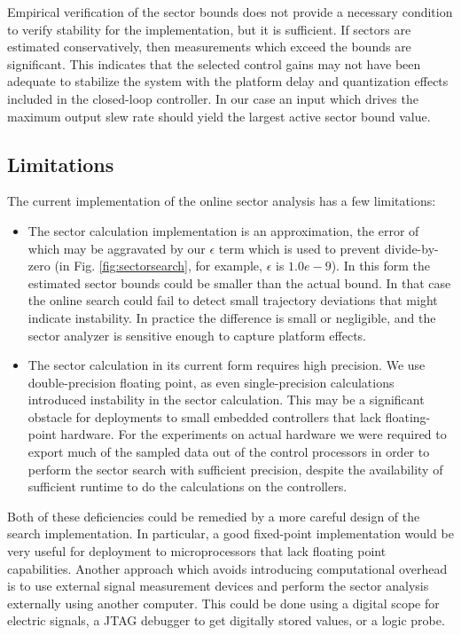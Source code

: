 Empirical verification of the sector bounds does not provide a necessary condition to verify
stability for the implementation, but it is sufficient. If sectors are estimated conservatively, 
then measurements which exceed the bounds are significant.  This indicates 
that the selected control gains may not have been adequate to stabilize the system with the 
platform delay and quantization effects included in the closed-loop controller.  In our case an 
input which drives the maximum output slew rate should yield the largest active sector bound
value.

\newpage

\subsection{Limitations}

The current implementation of the online sector analysis has a few limitations:

\begin{itemize}
 \item The sector calculation implementation is an approximation, the error of which may be
aggravated by our $\epsilon$ term which is used to prevent divide-by-zero  
(in Fig. \ref{fig:sectorsearch}, for example, $\epsilon$ is $1.0e-9$).  In this form the 
estimated sector bounds could be smaller than the actual bound.  In that case the online 
search could fail to detect small trajectory deviations that might indicate instability.  
In practice the difference is small or negligible, and the sector analyzer is sensitive enough 
to capture platform effects.
 \item The sector calculation in its current form requires high precision.  We use 
double-precision floating point, as even single-precision calculations introduced 
instability in the sector calculation.  This may be a significant obstacle for deployments
to small embedded controllers that lack floating-point hardware.  For the experiments on actual
hardware we were required to export much of the sampled data out of the control processors in order 
to perform the sector search with sufficient precision, despite the availability of sufficient 
runtime to do the calculations on the controllers.
\end{itemize}

Both of these deficiencies could be remedied by a more careful design of the search
implementation.  In particular, a good fixed-point implementation would be very useful
for deployment to microprocessors that lack floating point capabilities.  Another approach
which avoids introducing computational overhead is to use external signal measurement 
devices and perform the sector analysis externally using another computer. This could be 
done using a digital scope for electric signals, a JTAG debugger to get digitally stored 
values, or a logic probe.
